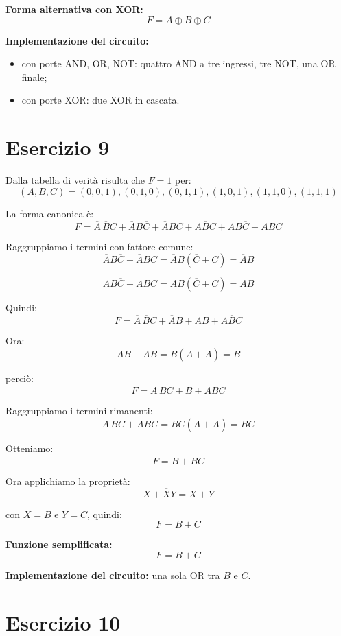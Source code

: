 \documentclass[a4paper,12pt]{article}
\begin{document}
	\textbf{Forma alternativa con XOR:}
	\[
	\boxed{F=A\oplus B\oplus C}
	\]
	
	\textbf{Implementazione del circuito:}
	\begin{itemize}
		\item con porte AND, OR, NOT: quattro AND a tre ingressi, tre NOT, una OR finale;
		\item con porte XOR: due XOR in cascata.
	\end{itemize}
	
	\bigskip
	
	\section*{Esercizio 9}
	
	Dalla tabella di verità risulta che $F=1$ per:
	\[
	(A,B,C)=(0,0,1),(0,1,0),(0,1,1),(1,0,1),(1,1,0),(1,1,1)
	\]
	
	La forma canonica è:
	\[
	F=\overline{A}\,\overline{B}C+\overline{A}B\overline{C}+\overline{A}BC+A\overline{B}C+AB\overline{C}+ABC
	\]
	
	Raggruppiamo i termini con fattore comune:
	\[
	\overline{A}B\overline{C}+\overline{A}BC=\overline{A}B(\overline{C}+C)=\overline{A}B
	\]
	
	\[
	AB\overline{C}+ABC=AB(\overline{C}+C)=AB
	\]
	
	Quindi:
	\[
	F=\overline{A}\,\overline{B}C+\overline{A}B+AB+A\overline{B}C
	\]
	
	Ora:
	\[
	\overline{A}B+AB=B(\overline{A}+A)=B
	\]
	
	perciò:
	\[
	F=\overline{A}\,\overline{B}C+B+A\overline{B}C
	\]
	
	Raggruppiamo i termini rimanenti:
	\[
	\overline{A}\,\overline{B}C+A\overline{B}C=\overline{B}C(\overline{A}+A)=\overline{B}C
	\]
	
	Otteniamo:
	\[
	F=B+\overline{B}C
	\]
	
	Ora applichiamo la proprietà:
	\[
	X+\overline{X}Y=X+Y
	\]
	
	con $X=B$ e $Y=C$, quindi:
	\[
	F=B+C
	\]
	
	\textbf{Funzione semplificata:}
	\[
	\boxed{F=B+C}
	\]
	
	\textbf{Implementazione del circuito:} una sola OR tra $B$ e $C$.
	
	\bigskip
	
	\section*{Esercizio 10}
	
\end{document}
